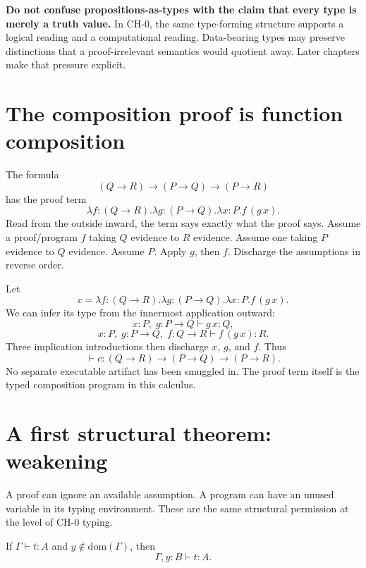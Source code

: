 \begin{warningbox}
\textbf{Do not confuse propositions-as-types with the claim that every type is merely a truth value.} In $\mathrm{CH}\text{-}0$, the same type-forming structure supports a logical reading and a computational reading. Data-bearing types may preserve distinctions that a proof-irrelevant semantics would quotient away. Later chapters make that pressure explicit.
\end{warningbox}



\section{The composition proof is function composition}

The formula
\[
 (Q\to R)\to(P\to Q)\to(P\to R)
\]
has the proof term
\[
 \lambda f{:}(Q\to R).\lambda g{:}(P\to Q).\lambda x{:}P. f\,(g\,x).
\]
Read from the outside inward, the term says exactly what the proof says. Assume a proof/program $f$ taking $Q$ evidence to $R$ evidence. Assume one taking $P$ evidence to $Q$ evidence. Assume $P$. Apply $g$, then $f$. Discharge the assumptions in reverse order.

\begin{workedexample}[title={Worked Example: composition as a proof object}]
Let
\[
 c=\lambda f{:}(Q\to R).\lambda g{:}(P\to Q).\lambda x{:}P.f\,(g\,x).
\]
We can infer its type from the innermost application outward:
\[
 x:P,\;g:P\to Q \vdash g\,x:Q,
\]
\[
 x:P,\;g:P\to Q,\;f:Q\to R \vdash f\,(g\,x):R.
\]
Three implication introductions then discharge $x$, $g$, and $f$. Thus
\[
 \vdash c:(Q\to R)\to(P\to Q)\to(P\to R).
\]
No separate executable artifact has been smuggled in. The proof term itself is the typed composition program in this calculus.
\end{workedexample}

\section{A first structural theorem: weakening}

A proof can ignore an available assumption. A program can have an unused variable in its typing environment. These are the same structural permission at the level of $\mathrm{CH}\text{-}0$ typing.

\begin{theorem}
\label{thm:weakening-imp}
If $\Gamma\vdash t:A$ and $y\notin\mathrm{dom}(\Gamma)$, then
\[
 \Gamma,y{:}B\vdash t:A.
\]
\end{theorem}

